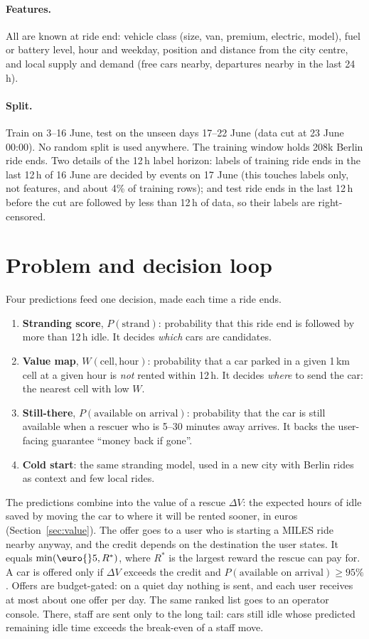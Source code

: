 \documentclass[11pt,a4paper]{article}
\newcommand{\eur}[1]{\euro{}#1}
\begin{document}
\paragraph{Features.} All are known at ride end: vehicle class (size, van, premium, electric, model), fuel or battery level, hour and weekday, position and distance from the city centre, and local supply and demand (free cars nearby, departures nearby in the last 24\,h).

\paragraph{Split.} Train on 3--16 June, test on the unseen days 17--22 June (data cut at 23 June 00:00). No random split is used anywhere. The training window holds 208k Berlin ride ends. Two details of the 12\,h label horizon: labels of training ride ends in the last 12\,h of 16 June are decided by events on 17 June (this touches labels only, not features, and about 4\% of training rows); and test ride ends in the last 12\,h before the cut are followed by less than 12\,h of data, so their labels are right-censored.

\section{Problem and decision loop}\label{sec:loop}

Four predictions feed one decision, made each time a ride ends.
\begin{enumerate}
\item \textbf{Stranding score}, $P(\text{strand})$: probability that this ride end is followed by more than 12\,h idle. It decides \emph{which} cars are candidates.
\item \textbf{Value map}, $W(\text{cell},\text{hour})$: probability that a car parked in a given 1\,km cell at a given hour is \emph{not} rented within 12\,h. It decides \emph{where} to send the car: the nearest cell with low $W$.
\item \textbf{Still-there}, $P(\text{available on arrival})$: probability that the car is still available when a rescuer who is 5--30 minutes away arrives. It backs the user-facing guarantee ``money back if gone''.
\item \textbf{Cold start}: the same stranding model, used in a new city with Berlin rides as context and few local rides.
\end{enumerate}
The predictions combine into the value of a rescue $\Delta V$: the expected hours of idle saved by moving the car to where it will be rented sooner, in euros (Section~\ref{sec:value}). The offer goes to a user who is starting a MILES ride nearby anyway, and the credit depends on the destination the user states. It equals $\min(\text{\eur{5}}, R^\ast)$, where $R^\ast$ is the largest reward the rescue can pay for. A car is offered only if $\Delta V$ exceeds the credit and $P(\text{available on arrival}) \geq 95\%$. Offers are budget-gated: on a quiet day nothing is sent, and each user receives at most about one offer per day. The same ranked list goes to an operator console. There, staff are sent only to the long tail: cars still idle whose predicted remaining idle time exceeds the break-even of a staff move.
\end{document}
